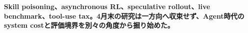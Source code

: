 \noindent\textbf{Skill poisoning、asynchronous RL、speculative rollout、live benchmark、tool-use tax。4月末の研究は一方向へ収束せず、Agent時代のsystem costと評価境界を別々の角度から掘り始めた。}\autocite{src-0d99a9f2485e,src-56e226358d6f,src-6bd60c76cba7,src-841d4b563b9d,src-8e578daed9ed}
